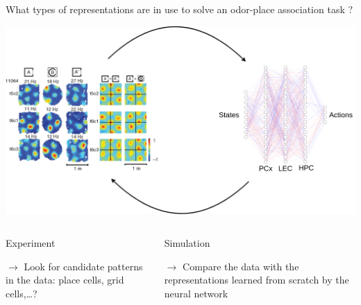 \documentclass[bigger]{beamer}
\begin{document}
\begin{frame}[label={sec:org70fa57d}]{What types of representations are in use to solve an odor-place association task ?}
\begin{center}
\includegraphics[height=0.4\textheight]{img/exp-vs-simu.drawio.png}
\end{center}
\vspace{-3em}
\begin{columns}
\begin{column}[t]{0.5\columnwidth}
\begin{center}
Experiment
\end{center}
\(\to\) Look for candidate patterns in the data: place cells, grid cells,\dots{}?
\end{column}
\begin{column}[t]{0.5\columnwidth}
\begin{center}
Simulation
\end{center}
\(\to\) Compare the data with the representations learned from scratch by the neural network

\end{column}
\end{columns}
\end{frame}
\end{document}
